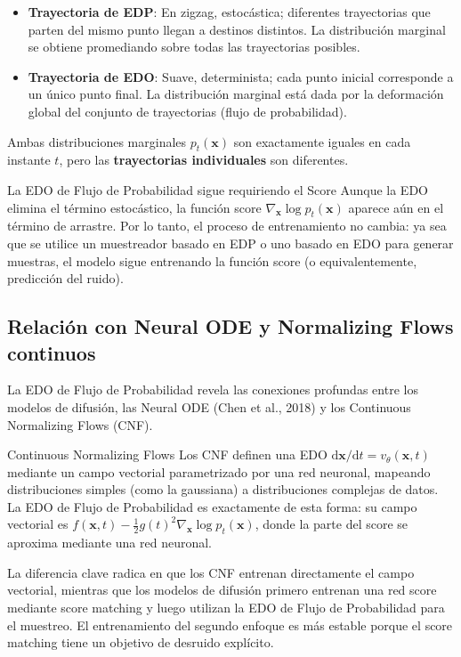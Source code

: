 \begin{itemize}
    \item \textbf{Trayectoria de EDP}: En zigzag, estocástica; diferentes trayectorias que parten del mismo punto llegan a destinos distintos. La distribución marginal se obtiene promediando sobre todas las trayectorias posibles.
    \item \textbf{Trayectoria de EDO}: Suave, determinista; cada punto inicial corresponde a un único punto final. La distribución marginal está dada por la deformación global del conjunto de trayectorias (flujo de probabilidad).
\end{itemize}

Ambas distribuciones marginales $p_t(\mathbf{x})$ son exactamente iguales en cada instante $t$, pero las \textbf{trayectorias individuales} son diferentes.

\begin{warningbox}{La EDO de Flujo de Probabilidad sigue requiriendo el Score}
Aunque la EDO elimina el término estocástico, la función score $\nabla_{\mathbf{x}} \log p_t(\mathbf{x})$ aparece aún en el término de arrastre. Por lo tanto, el proceso de entrenamiento no cambia: ya sea que se utilice un muestreador basado en EDP o uno basado en EDO para generar muestras, el modelo sigue entrenando la función score (o equivalentemente, predicción del ruido).
\end{warningbox}

\subsection{Relación con Neural ODE y Normalizing Flows continuos}

La EDO de Flujo de Probabilidad revela las conexiones profundas entre los modelos de difusión, las Neural ODE (Chen et al., 2018) y los Continuous Normalizing Flows (CNF).

\begin{knowledgebox}{Continuous Normalizing Flows}
Los CNF definen una EDO $\mathrm{d}\mathbf{x}/\mathrm{d}t = v_\theta(\mathbf{x}, t)$ mediante un campo vectorial parametrizado por una red neuronal, mapeando distribuciones simples (como la gaussiana) a distribuciones complejas de datos. La EDO de Flujo de Probabilidad es exactamente de esta forma: su campo vectorial es $f(\mathbf{x}, t) - \frac{1}{2}g(t)^2 \nabla_{\mathbf{x}} \log p_t(\mathbf{x})$, donde la parte del score se aproxima mediante una red neuronal.

La diferencia clave radica en que los CNF entrenan directamente el campo vectorial, mientras que los modelos de difusión primero entrenan una red score mediante score matching y luego utilizan la EDO de Flujo de Probabilidad para el muestreo. El entrenamiento del segundo enfoque es más estable porque el score matching tiene un objetivo de desruido explícito.
\end{knowledgebox}

